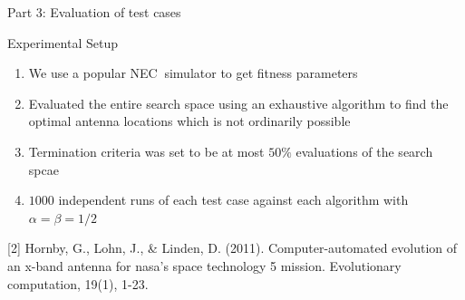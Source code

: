 \documentclass{beamer}
\begin{document}
\begin{frame}{\null}
    \begin{tcolorbox}[colback=green!5]
        \centering\Huge
        Part 3: Evaluation of test cases
    \end{tcolorbox}
\end{frame}

\begin{frame}{Experimental Setup}
\begin{enumerate}\itemsep1.2em
        \item We use a popular NEC\footnotemark $~$ simulator to get fitness parameters 
        \item Evaluated the entire search space using an exhaustive algorithm to find the optimal antenna locations which is not ordinarily possible
        \item Termination criteria was set to be at most $50\%$ evaluations of the search spcae
        \item $1000$ independent runs of each test case against each algorithm with $\alpha = \beta = 1/2$
    \end{enumerate}
    \vspace*{0.5cm}
    {\tiny [2] Hornby, G., Lohn, J., \& Linden, D. (2011). Computer-automated evolution of an x-band antenna for nasa's space technology 5 mission. Evolutionary computation, 19(1), 1-23. }
     
    
    \vspace{10mm}
\end{frame}
\end{document}
